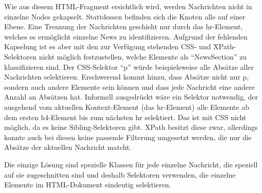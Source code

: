     Wie aus diesem HTML-Fragment ersichtlich wird,
    werden Nachrichten nicht in einzelne Nodes gekapselt.
    Stattdessen befinden sich die Knoten alle auf einer Ebene.
    Eine Trennung der Nachrichten geschieht nur durch das hr-Element,
    welches es ermöglicht einzelne News zu identifizieren.
    Aufgrund der fehlenden Kapselung ist es aber mit den zur Verfügung
    stehenden CSS- und XPath-Selektoren nicht möglich festzustellen,
    welche Elemente als "`NewsSection"' zu klassifizieren sind.
    Der CSS-Selektor "`p"' würde beispielsweise alle Absätze aller Nachrichten selektieren.
    Erschwerend kommt hinzu, dass Absätze nicht nur p,
    sondern auch andere Elemente sein können und dass jede Nachricht eine andere Anzahl an Absätzen hat.
    Informell ausgedrückt wäre ein Selektor notwendig,
    der ausgehend vom aktuellen Kontext-Element (das hr-Element) alle Elemente
    ab dem ersten h4-Element bis zum nächsten hr selektiert.
    Das ist mit CSS nicht möglich, da es keine Sibling-Selektoren gibt.
    XPath besitzt diese zwar, allerdings konnte auch bei diesen keine
    passende Filterung umgesetzt werden, die nur die Absätze der aktuellen Nachricht matcht.

    Die einzige Lösung sind spezielle Klassen für jede einzelne Nachricht,
    die speziell auf sie zugeschnitten sind und deshalb Selektoren verwenden,
    die einzelne Elemente im HTML-Dokument eindeutig selektieren.
